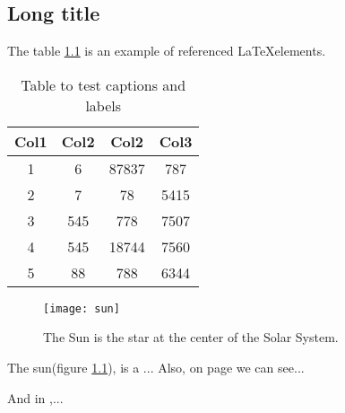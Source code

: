 \begin{refsection} %
\chapter[Short title]{Long title}

The table \ref{table:2} is an example of referenced \LaTeX elements.

\begin{table}[h!]
	\centering
	\begin{tabular}{||c c c c||} 
		\hline
		Col1 & Col2 & Col2 & Col3 \\ [0.5ex] 
		\hline\hline
		1 & 6 & 87837 & 787 \\ 
		2 & 7 & 78 & 5415 \\
		3 & 545 & 778 & 7507 \\
		4 & 545 & 18744 & 7560 \\
		5 & 88 & 788 & 6344 \\ [1ex] 
		\hline
	\end{tabular}
	\caption{Table to test captions and labels}
	\label{table:2}
\end{table}


\begin{figure}[ht]
	\centering
	\texttt{[image: sun]}
	\caption[The sun]{The Sun is the star at the center of the Solar System.}
	\centering
	\label{fig:3}
\end{figure}

The sun(figure \ref{fig:3}), is a ... Also, on page \pageref{fig:3}  we can see...

And in \cite{Piiponniemi2017},...

\printbibliography[heading=subbibliography, title={References}] %
\end{refsection}